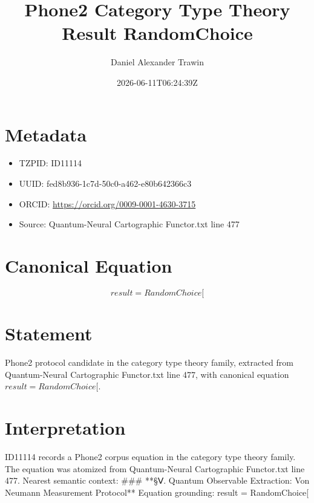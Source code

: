 \documentclass[11pt]{article}
\title{Phone2 Category Type Theory Result RandomChoice}
\author{Daniel Alexander Trawin}
\date{2026-06-11T06:24:39Z}
\begin{document}
\maketitle
\section*{Metadata}
\begin{itemize}
\item TZPID: ID11114
\item UUID: fed8b936-1c7d-50c0-a462-e80b642366c3
\item ORCID: \url{https://orcid.org/0009-0001-4630-3715}
\item Source: Quantum-Neural Cartographic Functor.txt line 477
\end{itemize}
\section*{Canonical Equation}
\[
result = RandomChoice[
\]
\section*{Statement}
Phone2 protocol candidate in the category type theory family, extracted from Quantum-Neural Cartographic Functor.txt line 477, with canonical equation $result = RandomChoice[$.
\section*{Interpretation}
ID11114 records a Phone2 corpus equation in the category type theory family. The equation was atomized from Quantum-Neural Cartographic Functor.txt line 477. Nearest semantic context: ### **§Ⅴ. Quantum Observable Extraction: Von Neumann Measurement Protocol** Equation grounding: result = RandomChoice[
\end{document}
